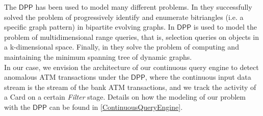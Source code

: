 The $\mathsf{DPP}$ has been used to model many different problems. In \cite{DP-bitriangles2021} they successfully solved the problem of progressively identify and enumerate bitriangles (i.e. a specific graph pattern) in bipartite evolving graphs. In \cite{DP-Lugosi_Enes_2019} $\mathsf{DPP}$ is used to model the problem of multidimensional range queries, that is, selection queries on objects in a k-dimensional space. Finally, in \cite{DP-Benedi_Garcia_2024} they solve the problem of computing and maintaining the minimum spanning tree of dynamic graphs.\\

In our case, we envision the architecture of our continuous query engine to detect anomalous ATM transactions under the $\mathsf{DPP}$, where the continuous input data stream is the stream of the bank ATM transactions, and we track the activity of a Card on a certain \emph{Filter} stage. Details on how the modeling of our problem with the $\mathsf{DPP}$ can be found in \ref{ContinuousQueryEngine}.



